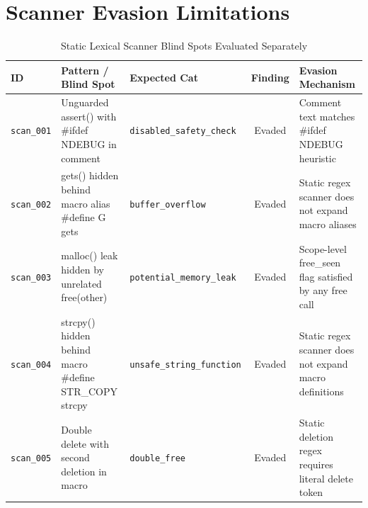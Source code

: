 \documentclass{article}
\begin{document}
\section{Scanner Evasion Limitations}
\begin{table}[htbp]
\centering
\caption{Static Lexical Scanner Blind Spots Evaluated Separately}
\label{tab:scanner-evasion}
\begin{tabularx}{\textwidth}{l X l c X}
\toprule
\textbf{ID} & \textbf{Pattern / Blind Spot} & \textbf{Expected Cat} & \textbf{Finding} & \textbf{Evasion Mechanism} \\
\midrule
\texttt{scan\_001} & Unguarded assert() with \#ifdef NDEBUG in comment & \texttt{disabled\_safety\_check} & Evaded & Comment text matches \#ifdef NDEBUG heuristic \\
\texttt{scan\_002} & gets() hidden behind macro alias \#define G gets & \texttt{buffer\_overflow} & Evaded & Static regex scanner does not expand macro aliases \\
\texttt{scan\_003} & malloc() leak hidden by unrelated free(other) & \texttt{potential\_memory\_leak} & Evaded & Scope-level free\_seen flag satisfied by any free call \\
\texttt{scan\_004} & strcpy() hidden behind macro \#define STR\_COPY strcpy & \texttt{unsafe\_string\_function} & Evaded & Static regex scanner does not expand macro definitions \\
\texttt{scan\_005} & Double delete with second deletion in macro & \texttt{double\_free} & Evaded & Static deletion regex requires literal delete token \\
\bottomrule
\end{tabularx}
\end{table}
\end{document}

